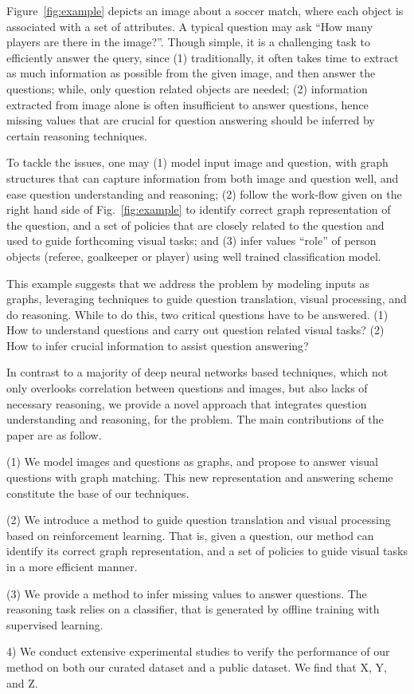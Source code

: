 \begin{example}
Figure~\ref{fig:example} depicts an image about a soccer match, where each object is associated with a set of attributes. A typical question may ask ``How many players are there in the image?''. Though simple, it is a challenging task to efficiently answer the query, since (1) traditionally, it often takes time to extract as much information as possible from the given image, and then answer the questions; while, only question related objects are needed; (2) information extracted from image alone is often insufficient to answer questions, hence missing values that are crucial for question answering should be inferred by certain reasoning techniques. 

To tackle the issues, one may (1) model input \ie image and question, with graph structures that can capture information from both image and question well, and ease question understanding and reasoning; (2) follow the work-flow given on the right hand side of Fig.~\ref{fig:example} to identify correct graph representation of the question, and a set of policies that are closely related to the question and used to guide forthcoming visual tasks; and (3) infer values \eg ``role'' of person objects (referee, goalkeeper or player) using well trained classification model.  
\end{example}

This example suggests that we address the \vqa problem by modeling inputs as graphs, leveraging techniques to guide question translation, visual processing, and do reasoning. While to do this, two critical questions have to be answered. (1) How to understand questions and carry out question related visual tasks? (2) How to infer crucial information to assist question answering?  


\vspace{2ex}
 In contrast to a majority of deep neural networks based \vqa techniques, which not only overlooks correlation between questions and images, but also lacks of necessary reasoning, we provide a novel approach that integrates question understanding and reasoning, for the \vqa problem. The main contributions of the paper are as follow.  

(1) We model images and questions as graphs, and propose to answer visual questions with graph matching. This new representation and answering scheme constitute the base of our techniques.  

(2) We introduce a method to guide question translation and visual processing based on reinforcement learning. That is, given a question, our method can identify its correct graph representation, and a set of policies to guide visual tasks in a more efficient manner. 

(3) We provide a method to infer missing values to answer questions. The reasoning task relies on a classifier, that is generated by offline training with supervised learning. 

4) We conduct extensive experimental studies to verify the performance of our method on both our curated \vqa dataset and a public \vqa dataset. We find that X, Y, and Z. 